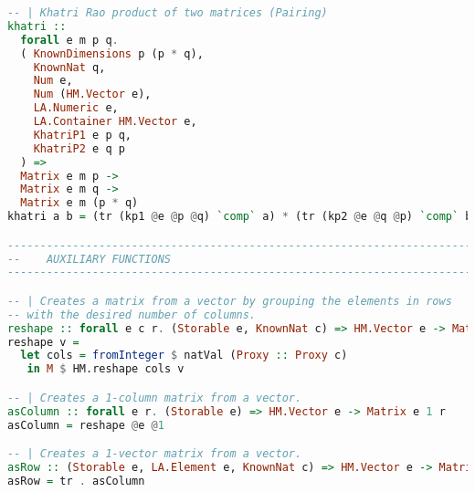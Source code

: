 \documentclass[
  oneside,
  11pt, a4paper,
  footinclude=true,
  headinclude=true,
  cleardoublepage=empty
]{scrbook}
\theoremstyle{definition}
\theoremstyle{definition}
\begin{document}
\begin{lstlisting}[language=Haskell, caption={Matrix.Internal},captionpos=b]
-- | Khatri Rao product of two matrices (Pairing)
khatri ::
  forall e m p q.
  ( KnownDimensions p (p * q),
    KnownNat q,
    Num e,
    Num (HM.Vector e),
    LA.Numeric e,
    LA.Container HM.Vector e,
    KhatriP1 e p q,
    KhatriP2 e q p
  ) =>
  Matrix e m p ->
  Matrix e m q ->
  Matrix e m (p * q)
khatri a b = (tr (kp1 @e @p @q) `comp` a) * (tr (kp2 @e @q @p) `comp` b)

-------------------------------------------------------------------------------
--    AUXILIARY FUNCTIONS
-------------------------------------------------------------------------------

-- | Creates a matrix from a vector by grouping the elements in rows
-- with the desired number of columns.
reshape :: forall e c r. (Storable e, KnownNat c) => HM.Vector e -> Matrix e c r
reshape v =
  let cols = fromInteger $ natVal (Proxy :: Proxy c)
   in M $ HM.reshape cols v

-- | Creates a 1-column matrix from a vector.
asColumn :: forall e r. (Storable e) => HM.Vector e -> Matrix e 1 r
asColumn = reshape @e @1

-- | Creates a 1-vector matrix from a vector.
asRow :: (Storable e, LA.Element e, KnownNat c) => HM.Vector e -> Matrix e c 1
asRow = tr . asColumn
    \end{lstlisting}

\end{document}
